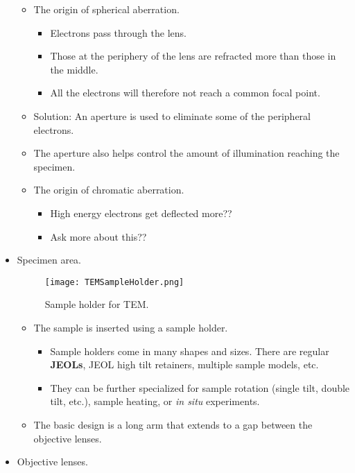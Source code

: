\documentclass[../notes.tex]{subfiles}
\begin{document}
\begin{itemize}
\begin{itemize}
        \item The origin of spherical aberration.
        \begin{itemize}
            \item Electrons pass through the lens.
            \item Those at the periphery of the lens are refracted more than those in the middle.
            \item All the electrons will therefore not reach a common focal point.
        \end{itemize}
        \item Solution: An aperture is used to eliminate some of the peripheral electrons.
        \item The aperture also helps control the amount of illumination reaching the specimen.
        \item The origin of chromatic aberration.
        \begin{itemize}
            \item High energy electrons get deflected more??
            \item Ask more about this??
        \end{itemize}
    \end{itemize}
    \item Specimen area.
    \begin{figure}[h!]
        \centering
        \texttt{[image: TEMSampleHolder.png]}
        \caption{Sample holder for TEM.}
        \label{fig:TEMSampleHolder}
    \end{figure}
    \begin{itemize}
        \item The sample is inserted using a sample holder.
        \begin{itemize}
            \item Sample holders come in many shapes and sizes. There are regular \textbf{JEOLs}, JEOL high tilt retainers, multiple sample models, etc.
            \item They can be further specialized for sample rotation (single tilt, double tilt, etc.), sample heating, or \emph{in situ} experiments.
        \end{itemize}
        \item The basic design is a long arm that extends to a gap between the objective lenses.
    \end{itemize}
    \item Objective lenses.
    \begin{itemize}

\end{itemize}
\end{itemize}
\end{document}
